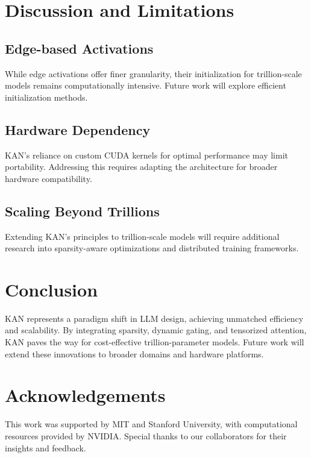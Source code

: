 \documentclass[twocolumn]{article}
\begin{document}
\section{Discussion and Limitations}
\subsection{Edge-based Activations}
While edge activations offer finer granularity, their initialization for trillion-scale models remains computationally intensive. Future work will explore efficient initialization methods.

\subsection{Hardware Dependency}
KAN's reliance on custom CUDA kernels for optimal performance may limit portability. Addressing this requires adapting the architecture for broader hardware compatibility.

\subsection{Scaling Beyond Trillions}
Extending KAN's principles to trillion-scale models will require additional research into sparsity-aware optimizations and distributed training frameworks.

\section{Conclusion}
KAN represents a paradigm shift in LLM design, achieving unmatched efficiency and scalability. By integrating sparsity, dynamic gating, and tensorized attention, KAN paves the way for cost-effective trillion-parameter models. Future work will extend these innovations to broader domains and hardware platforms.

\section*{Acknowledgements}
This work was supported by MIT and Stanford University, with computational resources provided by NVIDIA. Special thanks to our collaborators for their insights and feedback.



\end{document}
